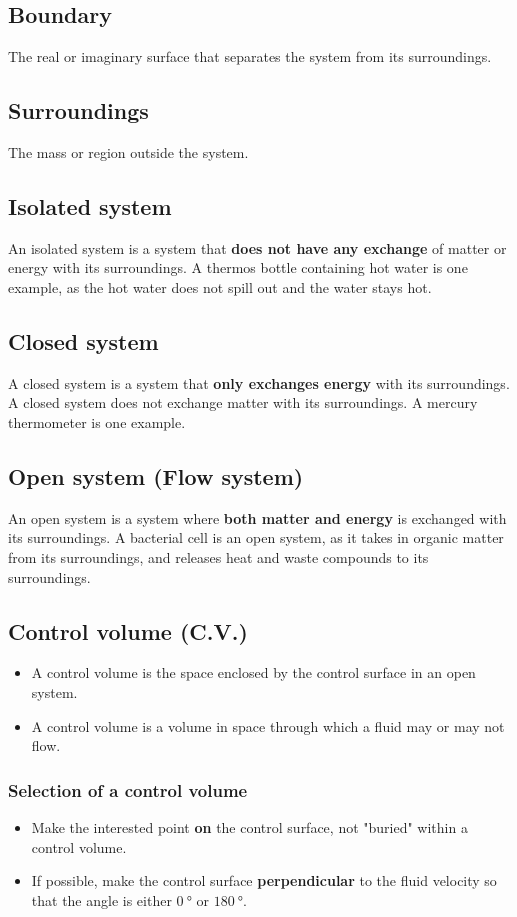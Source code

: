 \documentclass[11pt]{article}
\begin{document}
\subsection{Boundary}
\label{sec:org945c58d}
The real or imaginary surface that separates the system from its surroundings.
\subsection{Surroundings}
\label{sec:org18abf57}
The mass or region outside the system.
\subsection{Isolated system}
\label{sec:org591f14e}
An isolated system is a system that \textbf{does not have any exchange} of matter or energy with its surroundings. A thermos bottle containing hot water is one example, as the hot water does not spill out and the water stays hot.
\subsection{Closed system}
\label{sec:org5af5ce9}
A closed system is a system that \textbf{only exchanges energy} with its surroundings. A closed system does not exchange matter with its surroundings. A mercury thermometer is one example.
\subsection{Open system (Flow system)}
\label{sec:org9cd9a02}
An open system is a system where \textbf{both matter and energy} is exchanged with its surroundings. A bacterial cell is an open system, as it takes in organic matter from its surroundings, and releases heat and waste compounds to its surroundings.
\subsection{Control volume (C.V.)}
\label{sec:org6dfe9d5}
\begin{itemize}
\item A control volume is the space enclosed by the control surface in an open system.
\item A control volume is a volume in space through which a fluid may or may not flow.
\end{itemize}
\subsubsection{Selection of a control volume}
\label{sec:org1b88162}
\begin{itemize}
\item Make the interested point \textbf{on} the control surface, not "buried" within a control volume.
\item If possible, make the control surface \textbf{perpendicular} to the fluid velocity so that the angle is either \(\qty{0}{\degree}\) or \(\qty{180}{\degree}\).
\end{itemize}
\end{document}
